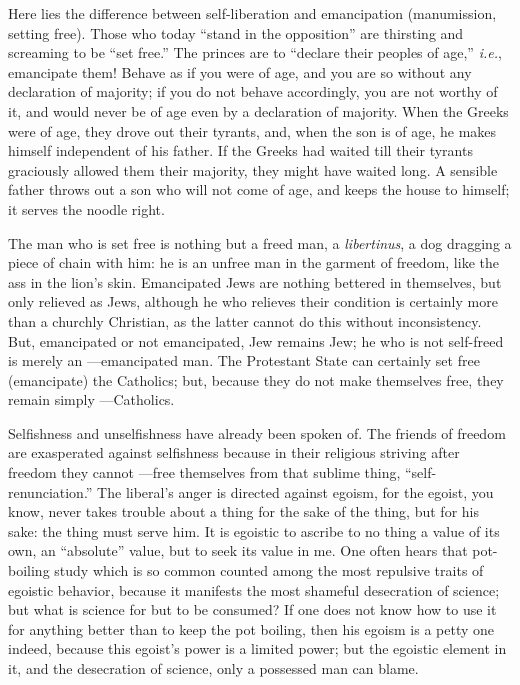 Here lies the difference between self-liberation and emancipation 
(manumission, setting free). Those who today ``stand in the opposition'' are 
thirsting and screaming to be ``set free.'' The princes are to ``declare 
their peoples of age,'' \textit{i.e.}, emancipate them! Behave as if you 
were of age, and you are so without any declaration of majority; if you do not 
behave accordingly, you are not worthy of it, and would never be of age even 
by a declaration of majority. When the Greeks were of age, they drove out 
their tyrants, and, when the son is of age, he makes himself independent of 
his father. If the Greeks had waited till their tyrants graciously allowed 
them their majority, they might have waited long. A sensible father throws out 
a son who will not come of age, and keeps the house to himself; it serves the 
noodle right.

The man who is set free is nothing but a freed man, a \textit{libertinus}, a 
dog dragging a piece of chain with him: he is an unfree man in the garment of 
freedom, like the ass in the lion's skin. Emancipated Jews are nothing 
bettered in themselves, but only relieved as Jews, although he who relieves 
their condition is certainly more than a churchly Christian, as the latter 
cannot do this without inconsistency. But, emancipated or not emancipated, Jew 
remains Jew; he who is not self-freed is merely an ---emancipated man. The 
Protestant State can certainly set free (emancipate) the Catholics; but, 
because they do not make themselves free, they remain simply ---Catholics.

Selfishness and unselfishness have already been spoken of. The friends of 
freedom are exasperated against selfishness because in their religious 
striving after freedom they cannot ---free themselves from that sublime thing, 
``self-renunciation.'' The liberal's anger is directed against egoism, for 
the egoist, you know, never takes trouble about a thing for the sake of the 
thing, but for his sake: the thing must serve him. It is egoistic to ascribe 
to no thing a value of its own, an ``absolute'' value, but to seek its value 
in me. One often hears that pot-boiling study which is so common counted among 
the most repulsive traits of egoistic behavior, because it manifests the most 
shameful desecration of science; but what is science for but to be consumed? 
If one does not know how to use it for anything better than to keep the pot 
boiling, then his egoism is a petty one indeed, because this egoist's power is 
a limited power; but the egoistic element in it, and the desecration of 
science, only a possessed man can blame.


